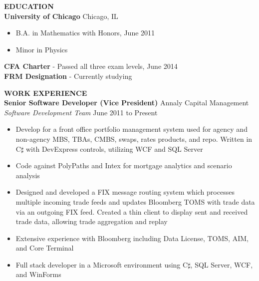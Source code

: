 \documentclass{article}
\begin{document}

\begin{flushleft}

\textbf{EDUCATION}\\
\hspace{20pt}
\textbf{University of Chicago} Chicago, IL
\begin{itemize}[leftmargin=50pt,itemsep=-2pt]
\item B.A. in Mathematics with Honors, June 2011
\item Minor in Physics
\end{itemize}
\hspace{20pt}
\textbf{CFA Charter} - Passed all three exam levels, June 2014\\
\vspace{6pt}
\hspace{20pt}
\textbf{FRM Designation} - Currently studying

\vspace{5pt}
\textbf{WORK EXPERIENCE}\\
\hspace{20pt}
\textbf{Senior Software Developer (Vice President)} \hfill Annaly Capital Management\\
\hspace{20pt}
\textit{Software Development Team} \hfill June 2011 to Present\\
\begin{itemize}[leftmargin=50pt,itemsep=-2pt]
\item Develop for a front office portfolio management system used for agency and non-agency MBS, TBAs, CMBS, swaps, rates products, and repo. Written in C$\sharp$ with DevExpress controls, utilizing WCF and SQL Server
\item Code against PolyPaths and Intex for mortgage analytics and scenario analysis
\item Designed and developed a FIX message routing system which processes multiple incoming trade feeds and updates Bloomberg TOMS with trade data via an outgoing FIX feed. Created a thin client to display sent and received trade data, allowing trade aggregation and replay
\item Extensive experience with Bloomberg including Data License, TOMS, AIM, and Core Terminal
\item Full stack developer in a Microsoft environment using C$\sharp$, SQL Server, WCF, and WinForms
\end{itemize}
 

\end{flushleft}
\end{document}
